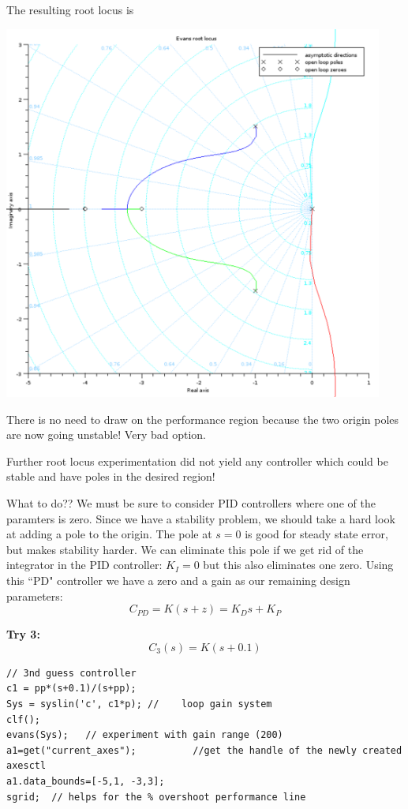 \begin{ExampleCont}
The resulting root locus is

\includegraphics[width=125mm]{figs11/des_examp_02a.png}

There is no need to draw on the performance region because the two origin poles are now going unstable!  Very bad option.

Further root locus experimentation did not yield any controller which could be stable and have poles in the desired region!

What to do??    We must be sure to consider PID controllers where one of the paramters is zero.   Since we have a stability problem, we should take a hard look at adding a pole to the origin. 
The pole at $s=0$ is good for steady state error, but makes stability harder. 
We can eliminate this pole if we get rid of the integrator in the PID controller: $K_I = 0$ but this also eliminates one zero.  Using this ``PD" controller we have a zero and a gain as our remaining design parameters:
\[
C_{PD} = K(s+z) = K_Ds + K_P
\]

{\bf Try 3: }
\[
C_3(s) = K(s+0.1)
\]
\begin{verbatim}
// 3nd guess controller
c1 = pp*(s+0.1)/(s+pp);
Sys = syslin('c', c1*p); //    loop gain system
clf();
evans(Sys);   // experiment with gain range (200)
a1=get("current_axes");          //get the handle of the newly created axesctl
a1.data_bounds=[-5,1, -3,3];
sgrid;  // helps for the % overshoot performance line
\end{verbatim}


\end{ExampleCont}

